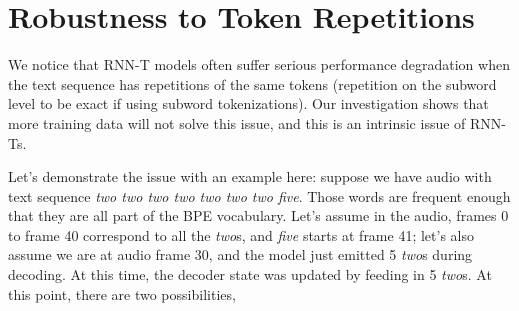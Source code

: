 \documentclass{article}
\begin{document}
\section{Robustness to Token Repetitions}
We notice that RNN-T models often suffer serious performance degradation when the text sequence has repetitions of the same tokens (repetition on the subword level to be exact if using subword tokenizations). Our investigation shows that more training data will not solve this issue, and this is an intrinsic issue of RNN-Ts.

Let's demonstrate the issue with an example here: suppose we have audio with text sequence \emph{two two two two two two two five}. Those words are frequent enough that they are all part of the BPE vocabulary. Let's assume in the audio, frames 0 to frame 40 correspond to all the \emph{two}s, and \emph{five} starts at frame 41; let's also assume we are at audio frame 30, and the model just emitted 5 \emph{two}s during  decoding. At this time, the decoder state was updated by feeding in 5 \emph{two}s.
At this point, there are two possibilities,
\end{document}
